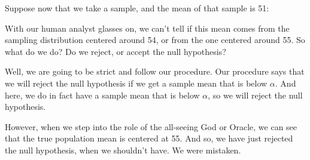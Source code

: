 \documentclass[../../../main.tex]{subfiles}
\begin{document}
Suppose now that we take a sample, and the mean of that sample is 51:

\begin{center}
\end{center}

\noindent
With our human analyst glasses on, we can't tell if this mean comes from the sampling distribution centered around 54, or from the one centered around 55. So what do we do? Do we reject, or accept the null hypothesis? 

Well, we are going to be strict and follow our procedure. Our procedure says that we will reject the null hypothesis if we get a sample mean that is below $\alpha$. And here, we do in fact have a sample mean that is below $\alpha$, so we will reject the null hypothesis.

However, when we step into the role of the all-seeing God or Oracle, we can see that the true population mean is centered at 55. And so, we have just rejected the null hypothesis, when we shouldn't have. We were mistaken. 
\end{document}
